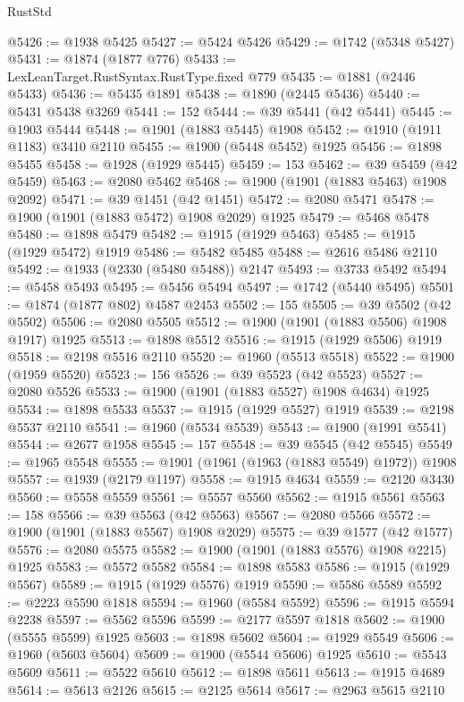 \begin{lexlean}{RustStd}
\begin{coremodule}
{\begin{coremodule}
{{{{{{{{{{{{{{{{{{{{{{{{{{{{{{{{{{{{{{{{{{{@5426 := @1938 @5425
@5427 := @5424 @5426
@5429 := @1742 (@5348 @5427)
@5431 := @1874 (@1877 @776)
@5433 := LexLeanTarget.RustSyntax.RustType.fixed @779
@5435 := @1881 (@2446 @5433)
@5436 := @5435 @1891
@5438 := @1890 (@2445 @5436)
@5440 := @5431 @5438 @3269
@5441 := 152
@5444 := @39 @5441 (@42 @5441)
@5445 := @1903 @5444
@5448 := @1901 (@1883 @5445) @1908
@5452 := @1910 (@1911 @1183) @3410 @2110
@5455 := @1900 (@5448 @5452) @1925
@5456 := @1898 @5455
@5458 := @1928 (@1929 @5445)
@5459 := 153
@5462 := @39 @5459 (@42 @5459)
@5463 := @2080 @5462
@5468 := @1900 (@1901 (@1883 @5463) @1908 @2092)
@5471 := @39 @1451 (@42 @1451)
@5472 := @2080 @5471
@5478 := @1900 (@1901 (@1883 @5472) @1908 @2029) @1925
@5479 := @5468 @5478
@5480 := @1898 @5479
@5482 := @1915 (@1929 @5463)
@5485 := @1915 (@1929 @5472) @1919
@5486 := @5482 @5485
@5488 := @2616 @5486 @2110
@5492 := @1933 (@2330 (@5480 @5488)) @2147
@5493 := @3733 @5492
@5494 := @5458 @5493
@5495 := @5456 @5494
@5497 := @1742 (@5440 @5495)
@5501 := @1874 (@1877 @802) @4587 @2453
@5502 := 155
@5505 := @39 @5502 (@42 @5502)
@5506 := @2080 @5505
@5512 := @1900 (@1901 (@1883 @5506) @1908 @1917) @1925
@5513 := @1898 @5512
@5516 := @1915 (@1929 @5506) @1919
@5518 := @2198 @5516 @2110
@5520 := @1960 (@5513 @5518)
@5522 := @1900 (@1959 @5520)
@5523 := 156
@5526 := @39 @5523 (@42 @5523)
@5527 := @2080 @5526
@5533 := @1900 (@1901 (@1883 @5527) @1908 @4634) @1925
@5534 := @1898 @5533
@5537 := @1915 (@1929 @5527) @1919
@5539 := @2198 @5537 @2110
@5541 := @1960 (@5534 @5539)
@5543 := @1900 (@1991 @5541)
@5544 := @2677 @1958
@5545 := 157
@5548 := @39 @5545 (@42 @5545)
@5549 := @1965 @5548
@5555 := @1901 (@1961 (@1963 (@1883 @5549) @1972)) @1908
@5557 := @1939 (@2179 @1197)
@5558 := @1915 @4634
@5559 := @2120 @3430
@5560 := @5558 @5559
@5561 := @5557 @5560
@5562 := @1915 @5561
@5563 := 158
@5566 := @39 @5563 (@42 @5563)
@5567 := @2080 @5566
@5572 := @1900 (@1901 (@1883 @5567) @1908 @2029)
@5575 := @39 @1577 (@42 @1577)
@5576 := @2080 @5575
@5582 := @1900 (@1901 (@1883 @5576) @1908 @2215) @1925
@5583 := @5572 @5582
@5584 := @1898 @5583
@5586 := @1915 (@1929 @5567)
@5589 := @1915 (@1929 @5576) @1919
@5590 := @5586 @5589
@5592 := @2223 @5590 @1818
@5594 := @1960 (@5584 @5592)
@5596 := @1915 @5594 @2238
@5597 := @5562 @5596
@5599 := @2177 @5597 @1818
@5602 := @1900 (@5555 @5599) @1925
@5603 := @1898 @5602
@5604 := @1929 @5549
@5606 := @1960 (@5603 @5604)
@5609 := @1900 (@5544 @5606) @1925
@5610 := @5543 @5609
@5611 := @5522 @5610
@5612 := @1898 @5611
@5613 := @1915 @4689
@5614 := @5613 @2126
@5615 := @2125 @5614
@5617 := @2963 @5615 @2110
}}}}}}}}}}}}}}}}}}}}}}}}}}}}}}}}}}}}}}}}}}}
\end{coremodule}}
\end{coremodule}
\end{lexlean}
